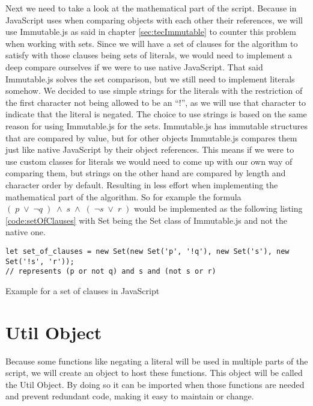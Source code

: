 Next we need to take a look at the mathematical part of the script. Because in JavaScript uses when comparing objects with each other their references, we will use Immutable.js as said in chapter \ref{sec:tecImmutable} to counter this problem when working with sets. Since we will have a set of clauses for the algorithm to satisfy with those clauses being sets of literals, we would need to implement a deep compare ourselves if we were to use native JavaScript. That said Immutable.js solves the set comparison, but we still need to implement literals somehow. We decided to use simple strings for the literals with the restriction of the first character not being allowed to be an ``!'', as we will use that character to indicate that the literal is negated. The choice to use strings is based on the same reason for using Immutable.js for the sets. Immutable.js has immutable structures that are compared by value, but for other objects Immutable.js compares them just like native JavaScript by their object references. This means if we were to use custom classes for literals we would need to come up with our own way of comparing them, but strings on the other hand are compared by length and character order by default. Resulting in less effort when implementing the mathematical part of the algorithm.
So for example the formula $(\; p\; \lor\; \neg q\; )\; \land\; s\; \land\; (\; \neg s\; \lor\; r\; )$ would be implemented as the following listing \ref{code:setOfClauses} with Set being the Set class of Immutable.js and not the native one.

\begin{listing}[h!]
\begin{verbatim}
let set_of_clauses = new Set(new Set('p', '!q'), new Set('s'), new Set('!s', 'r'));
// represents (p or not q) and s and (not s or r)
\end{verbatim}
    \caption{Example for a set of clauses in JavaScript}
    \label{code:setOfClauses}
\end{listing}

\section{Util Object}
\label{sec:impUtil}
Because some functions like negating a literal will be used in multiple parts of the script, we will create an object to host these functions. This object will be called the Util Object. By doing so it can be imported when those functions are needed and prevent redundant code, making it easy to maintain or change.

